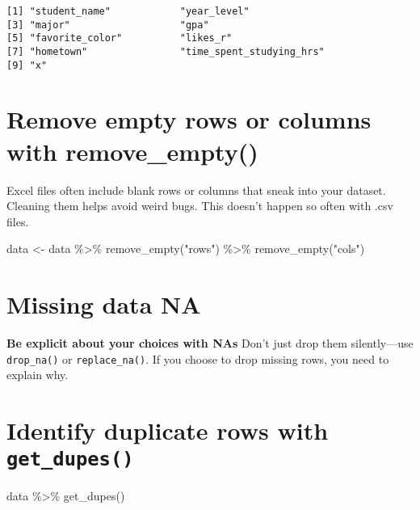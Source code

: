 \documentclass[
  letterpaper,
  DIV=11,
  numbers=noendperiod]{scrartcl}
\newenvironment{Shaded}{\begin{snugshade}}{\end{snugshade}}
\newcommand{\FunctionTok}[1]{\textcolor[rgb]{0.28,0.35,0.67}{#1}}
\newcommand{\NormalTok}[1]{\textcolor[rgb]{0.00,0.23,0.31}{#1}}
\newcommand{\OtherTok}[1]{\textcolor[rgb]{0.00,0.23,0.31}{#1}}
\newcommand{\SpecialCharTok}[1]{\textcolor[rgb]{0.37,0.37,0.37}{#1}}
\newcommand{\StringTok}[1]{\textcolor[rgb]{0.13,0.47,0.30}{#1}}
\begin{document}
\begin{verbatim}
[1] "student_name"            "year_level"             
[3] "major"                   "gpa"                    
[5] "favorite_color"          "likes_r"                
[7] "hometown"                "time_spent_studying_hrs"
[9] "x"                      
\end{verbatim}

\hypertarget{remove-empty-rows-or-columns-with-remove_empty}{%
\section{Remove empty rows or columns with
remove\_empty()}\label{remove-empty-rows-or-columns-with-remove_empty}}

Excel files often include blank rows or columns that sneak into your
dataset. Cleaning them helps avoid weird bugs. This doesn't happen so
often with .csv files.

\begin{Shaded}
\begin{Highlighting}[]
\NormalTok{data }\OtherTok{\textless{}{-}}\NormalTok{ data }\SpecialCharTok{\%\textgreater{}\%} 
  \FunctionTok{remove\_empty}\NormalTok{(}\StringTok{"rows"}\NormalTok{) }\SpecialCharTok{\%\textgreater{}\%} 
  \FunctionTok{remove\_empty}\NormalTok{(}\StringTok{"cols"}\NormalTok{)}
\end{Highlighting}
\end{Shaded}

\hypertarget{missing-data-na}{%
\section{Missing data NA}\label{missing-data-na}}

\textbf{Be explicit about your choices with NAs} Don't just drop them
silently---use \texttt{drop\_na()} or \texttt{replace\_na()}. If you
choose to drop missing rows, you need to explain why.

\hypertarget{identify-duplicate-rows-with-get_dupes}{%
\section{\texorpdfstring{Identify duplicate rows with
\texttt{get\_dupes()}}{Identify duplicate rows with get\_dupes()}}\label{identify-duplicate-rows-with-get_dupes}}

\begin{Shaded}
\begin{Highlighting}[]
\NormalTok{data }\SpecialCharTok{\%\textgreater{}\%} 
  \FunctionTok{get\_dupes}\NormalTok{()}
\end{Highlighting}
\end{Shaded}
\end{document}
